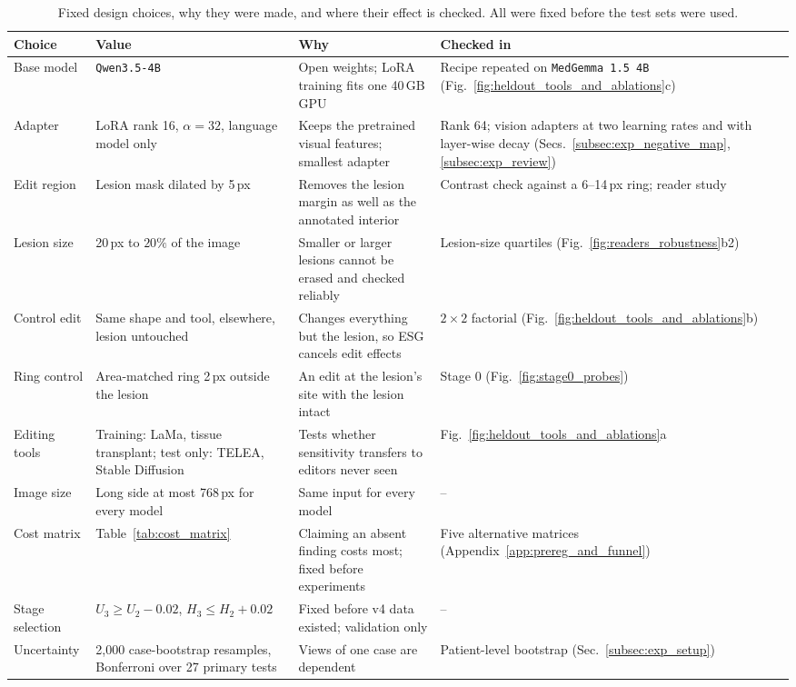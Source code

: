 \documentclass[5p,times,twocolumn,authoryear]{elsarticle}
\begin{document}
\begin{table}[!t]
\caption{Fixed design choices, why they were made, and where their effect is checked. All were fixed before the test sets were used.}
\label{tab:design}
\begin{center}
\small
\begin{adjustbox}{max width=\linewidth}
\begin{tabular}{L{2.6cm}L{3.4cm}L{4.6cm}L{3.6cm}}
\toprule
\textbf{Choice} & \textbf{Value} & \textbf{Why} & \textbf{Checked in} \\
\midrule
Base model & \texttt{Qwen3.5-4B} & Open weights; LoRA training fits one 40\,GB GPU & Recipe repeated on \texttt{MedGemma 1.5 4B} (Fig.~\ref{fig:heldout_tools_and_ablations}c) \\
Adapter & LoRA rank 16, $\alpha = 32$, language model only & Keeps the pretrained visual features; smallest adapter & Rank 64; vision adapters at two learning rates and with layer-wise decay (Secs.~\ref{subsec:exp_negative_map}, \ref{subsec:exp_review}) \\
Edit region & Lesion mask dilated by 5\,px & Removes the lesion margin as well as the annotated interior & Contrast check against a 6--14\,px ring; reader study \\
Lesion size & 20\,px to $20\%$ of the image & Smaller or larger lesions cannot be erased and checked reliably & Lesion-size quartiles (Fig.~\ref{fig:readers_robustness}b2) \\
Control edit & Same shape and tool, elsewhere, lesion untouched & Changes everything but the lesion, so ESG cancels edit effects & $2\times 2$ factorial (Fig.~\ref{fig:heldout_tools_and_ablations}b) \\
Ring control & Area-matched ring 2\,px outside the lesion & An edit at the lesion's site with the lesion intact & Stage 0 (Fig.~\ref{fig:stage0_probes}) \\
Editing tools & Training: LaMa, tissue transplant; test only: TELEA, Stable Diffusion & Tests whether sensitivity transfers to editors never seen & Fig.~\ref{fig:heldout_tools_and_ablations}a \\
Image size & Long side at most 768\,px for every model & Same input for every model & -- \\
Cost matrix & Table~\ref{tab:cost_matrix} & Claiming an absent finding costs most; fixed before experiments & Five alternative matrices (Appendix~\ref{app:prereg_and_funnel}) \\
Stage selection & $U_3 \ge U_2 - 0.02$, $H_3 \le H_2 + 0.02$ & Fixed before v4 data existed; validation only & -- \\
Uncertainty & 2{,}000 case-bootstrap resamples, Bonferroni over 27 primary tests & Views of one case are dependent & Patient-level bootstrap (Sec.~\ref{subsec:exp_setup}) \\
\bottomrule
\end{tabular}
\end{adjustbox}
\end{center}
\end{table}
\end{document}
